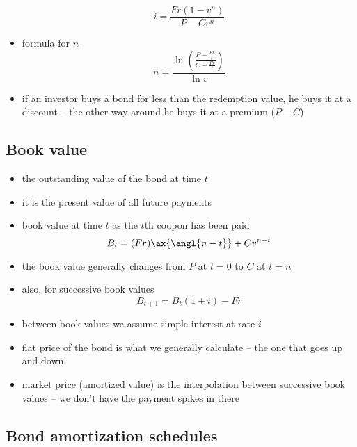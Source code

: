 \documentclass[../00_main.tex]{subfiles}
\begin{document}
\begin{itemize}
        \begin{equation}\nonumber
            i = \frac{Fr(1-v^n)}{P - Cv^n}
        \end{equation}
    \item formula for $n$
        \begin{equation}\nonumber
            n = \frac{\ln \left( \frac{P - \frac{Fr}{i}}{C
                - \frac{Fr}{i}}\right)}{\ln v}
        \end{equation}
    \item if an investor buys a bond for less than the redemption value, he
        buys it at a discount -- the other way around he buys it at a premium
        ($P-C$)
\end{itemize}

\subsection{Book value}

\begin{itemize}
    \item the outstanding value of the bond at time $t$
    \item it is the present value of all future payments
    \item book value at time $t$ as the $t$th coupon has been paid
        \begin{equation}\nonumber
            B_t = (Fr) \ax{\angl{n-t}} + Cv^{n-t}
        \end{equation}
    \item the book value generally changes from $P$ at $t=0$ to $C$ at $t=n$
    \item also, for successive book values
        \begin{equation}\nonumber
            B_{t+1} = B_t(1+i) - Fr
        \end{equation}
    \item between book values we assume simple interest at rate $i$
    \item flat price of the bond is what we generally calculate -- the one that
        goes up and down
    \item market price (amortized value) is the interpolation between 
        successive book values -- we don't have the payment spikes in there
\end{itemize}

\subsection{Bond amortization schedules}
\end{document}
